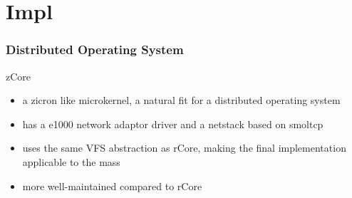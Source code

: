\documentclass{ctexbeamer}
\begin{document}
\section{Impl}
\begin{frame}
\frametitle{Distributed Operating System}
\begin{exampleblock}{zCore}
  \begin{itemize}
    \item a zicron like microkernel, a natural fit for a distributed operating system
    \item has a e1000 network adaptor driver and a netstack based on smoltcp
    \item uses the same VFS abstraction as rCore, making the final implementation applicable to the mass
    \item more well-maintained compared to rCore
  \end{itemize}
\end{exampleblock}
\end{frame}

\section{}
\frame{\titlepage}
\end{document}
